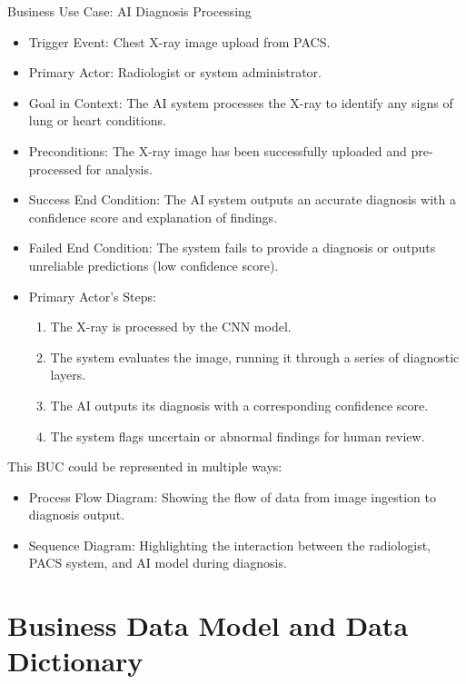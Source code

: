 \documentclass[12pt]{article}
\begin{document}
Business Use Case: AI Diagnosis Processing
\begin{itemize}
    \item Trigger Event: Chest X-ray image upload from PACS.
    \item Primary Actor: Radiologist or system administrator.
    \item Goal in Context: The AI system processes the X-ray to identify any signs of lung or 
    heart conditions.
    \item Preconditions: The X-ray image has been successfully uploaded and pre-processed for 
    analysis.
    \item Success End Condition: The AI system outputs an accurate diagnosis with a confidence 
    score and explanation of findings.
    \item Failed End Condition: The system fails to provide a diagnosis or outputs unreliable 
    predictions (low confidence score).
    \item {
        Primary Actor's Steps:
        \begin{enumerate}
            \item The X-ray is processed by the CNN model.
            \item The system evaluates the image, running it through a series of diagnostic layers.
            \item The AI outputs its diagnosis with a corresponding confidence score.
            \item The system flags uncertain or abnormal findings for human review.
        \end{enumerate}
    }
\end{itemize}

This BUC could be represented in multiple ways:
\begin{itemize}
    \item Process Flow Diagram: Showing the flow of data from image ingestion to diagnosis output.
    \item Sequence Diagram: Highlighting the interaction between the radiologist, PACS system, and 
        AI model during diagnosis.
\end{itemize}

\section{Business Data Model and Data Dictionary}
\end{document}
